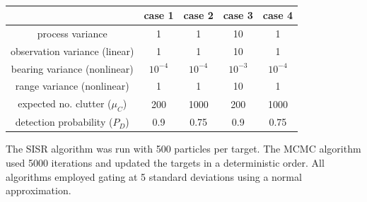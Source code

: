 \begin{table}%
\begin{center}
\begin{tabular}{|c|c|c|c|c|}
\hline
 & case 1 & case 2 & case 3 & case 4 \\
\hline \hline
process variance & 1 & 1 & 10 & 1 \\
observation variance (linear) & 1 & 1 & 10 & 1 \\
bearing variance (nonlinear) & $10^{-4}$ & $10^{-4}$ & $10^{-3}$ & $10^{-4}$ \\
range variance (nonlinear) & 1 & 1 & 10 & 1 \\
expected no. clutter ($\mu_C$) & 200 & 1000 & 200 & 1000 \\
detection probability ($P_D$) & 0.9 & 0.75 & 0.9 & 0.75 \\
\hline
\end{tabular}
\end{center}
\caption{}
\label{tab:CaseParameters}
\end{table}

The SISR algorithm was run with 500 particles per target. The MCMC algorithm used 5000 iterations and updated the targets in a deterministic order. All algorithms employed gating at 5 standard deviations using a normal approximation.